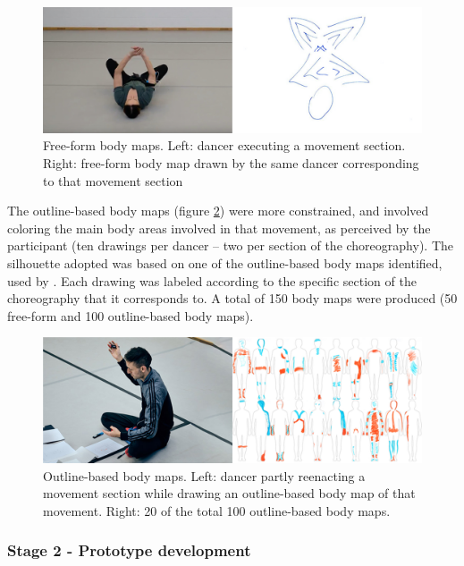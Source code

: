\begin{figure}[ht]
  \centering
  \includegraphics[width=0.9\linewidth]{Chapters/Figures/modi_dis/Zjana.jpg}
  \caption[Free-form body maps]{Free-form body maps. Left: dancer executing a movement section. Right: free-form body map drawn by the same dancer corresponding to that movement section}
    \label{fig:free-form-map}
\end{figure}

The outline-based body maps (figure \ref{fig:outline-based-map})  were more constrained, and involved coloring the main body areas involved in that movement, as perceived by the participant (ten drawings per dancer – two per section of the choreography). The silhouette adopted was based on one of the outline-based body maps identified, used by  \cite{nummenmaa_bodily_2014}. Each drawing was labeled according to the specific section of the choreography that it corresponds to. A total of 150 body maps were produced (50 free-form and 100 outline-based body maps).

\begin{figure}[ht]
  \centering
  \includegraphics[width=0.9\linewidth]{Chapters/Figures/modi_dis/Juan.jpg}
  \caption[Outline-based body maps]{Outline-based body maps. Left: dancer partly reenacting a movement section while drawing an outline-based body map of that movement. Right: 20 of the total 100 outline-based body maps.}
    \label{fig:outline-based-map}
\end{figure}

\subsubsection{Stage 2 - Prototype development}

